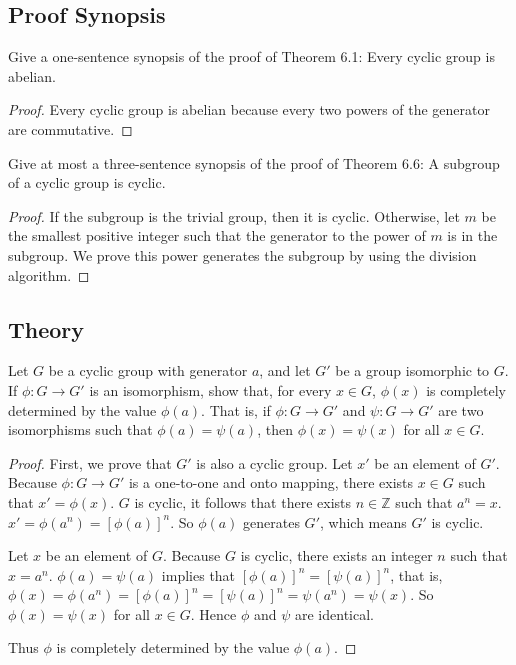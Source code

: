 \subsection*{Proof Synopsis}

\begin{exercise}
    Give a one-sentence synopsis of the proof of Theorem 6.1: Every cyclic group is abelian.
\end{exercise}

\begin{proof}
    Every cyclic group is abelian because every two powers of the generator are commutative.
\end{proof}

\begin{exercise}
    Give at most a three-sentence synopsis of the proof of Theorem 6.6: A subgroup of a cyclic group is cyclic.
\end{exercise}

\begin{proof}
    If the subgroup is the trivial group, then it is cyclic. Otherwise, let $m$ be the smallest positive integer such that the generator to the power of $m$ is in the subgroup. We prove this power generates the subgroup by using the division algorithm.
\end{proof}

\subsection*{Theory}

\begin{exercise}
    Let $G$ be a cyclic group with generator $a$, and let $G'$ be a group isomorphic to $G$. If $\phi: G \to G'$ is an isomorphism, show that, for every $x\in G$, $\phi(x)$ is completely determined by the value $\phi(a)$. That is, if $\phi: G \to G'$ and $\psi: G \to G'$ are two isomorphisms such that $\phi(a) = \psi(a)$, then $\phi(x) = \psi(x)$ for all $x\in G$.
\end{exercise}

\begin{proof}
    First, we prove that $G'$ is also a cyclic group. Let $x'$ be an element of $G'$. Because $\phi: G \to G'$ is a one-to-one and onto mapping, there exists $x\in G$ such that $x' = \phi(x)$. $G$ is cyclic, it follows that there exists $n\in\mathbb{Z}$ such that $a^{n} = x$. $x' = \phi(a^{n}) = {[\phi(a)]}^{n}$. So $\phi(a)$ generates $G'$, which means $G'$ is cyclic.

    Let $x$ be an element of $G$. Because $G$ is cyclic, there exists an integer $n$ such that $x = a^{n}$. $\phi(a) = \psi(a)$ implies that ${[\phi(a)]}^{n} = {[\psi(a)]}^{n}$, that is, $\phi(x) = \phi(a^{n}) = {[\phi(a)]}^{n} = {[\psi(a)]}^{n} = \psi(a^{n}) = \psi(x)$. So $\phi(x) = \psi(x)$ for all $x\in G$. Hence $\phi$ and $\psi$ are identical.

    Thus $\phi$ is completely determined by the value $\phi(a)$.
\end{proof}

